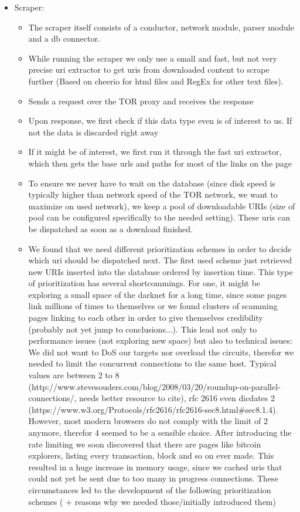 \documentclass[USenglish,oneside,twocolumn]{article}
\begin{document}
\begin{itemize}
  \item Scraper:
    \begin{itemize}
      \item The scraper itself consists of a conductor, network module, parser module and a db connector.
      \item While running the scraper we only use a small and fast, but not very precise uri extractor to get uris from downloaded content to scrape further (Based on cheerio for html files and RegEx for other text files).
      \item Sends a request over the TOR proxy and receives the response
      \item Upon response, we first check if this data type even is of interest to us. If not the data is discarded right away
      \item If it might be of interest, we first run it through the fast uri extractor, which then gets the base urls and paths for most of the links on the page
      \item To ensure we never have to wait on the database (since disk speed is typically higher than network speed of the TOR network, we want to maximize on used network), we keep a pool of downloadable URIs (size of pool can be configured specifically to the needed setting). These uris can be dispatched as soon as a download finished.
      \item We found that we need different prioritization schemes in order to decide which uri should be dispatched next. The first used scheme just retrieved new URIs inserted into the database ordered by insertion time. This type of prioritization has several shortcommings. For one, it might be exploring a small space of the darknet for a long time, since some pages link millions of times to themselves or we found clusters of scamming pages linking to each other in order to give themselves credibility (probably not yet jump to conclusions...). This lead not only to performance issues (not exploring new space) but also to technical issues: We did not want to DoS our targets nor overload the circuits, therefor we needed to limit the concurrent connections to the same host. Typical values are between 2 to 8 (http://www.stevesouders.com/blog/2008/03/20/roundup-on-parallel-connections/, needs better resource to cite), rfc 2616 even dicdates 2 (https://www.w3.org/Protocols/rfc2616/rfc2616-sec8.html#sec8.1.4). However, most modern browsers do not comply with the limit of 2 anymore, therefor 4 seemed to be a sensible choice. After introducing the rate limiting we soon discovered that there are pages like bitcoin explorers, listing every transaction, block and so on ever made. This resulted in a huge increase in memory usage, since we cached uris that could not yet be sent due to too many in progress connections. These circumstances led to the development of the following prioritization schemes ( + reasons why we needed those/initially introduced them)

\end{itemize}
\end{itemize}
\end{document}
